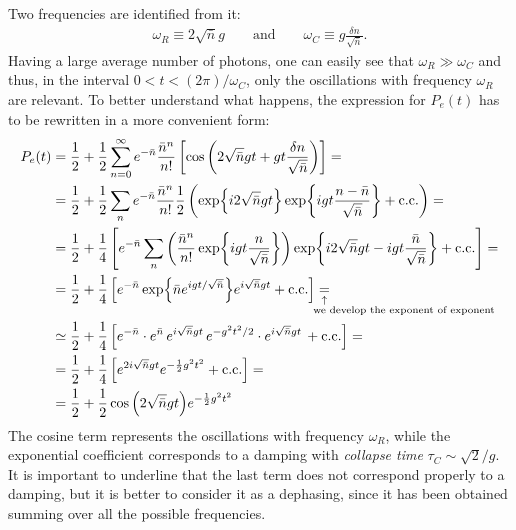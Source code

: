Two frequencies are identified from it: 
\begin{align}
    \omega_R \equiv 2 \sqrt{\bar{n}} g \qquad \text{and} \qquad \omega_C \equiv g \frac{\delta n}{\sqrt{\bar{n}}}. 
\end{align}
Having a large average number of photons, one can easily see that $\omega_R \gg \omega_C$ and thus, in the interval $0 < t < (2 \pi)/\omega_C$, only the oscillations with frequency $\omega_R$ are relevant. To better understand what happens, the expression for $P_e(t)$ has to be rewritten in a more convenient form:
\begin{align}
     P_e(t) & = \frac{1}{2} + \frac{1}{2} \sum_{n=0}^\infty e^{-\bar{n}} \frac{\bar{n}^n}{n!} \left[ \cos{\left( 2  \sqrt{\bar{n}} gt + gt \frac{\delta n}{\sqrt{\bar{n}}} \right)}\right] = \label{eq:st1}\\
     &= \frac{1}{2} + \frac{1}{2} \sum_n e^{-\bar{n}} \frac{\bar{n}^n}{n!} \frac{1}{2} \left( \exp{i 2 \sqrt{\bar{n}} gt} \exp{igt\frac{n-\bar{n}}{\sqrt{\bar{n}}}} + \text{c.c.} \right) = \nonumber \\
     & = \frac{1}{2} + \frac{1}{4}\left[ e^{-\bar{n}} \sum_n \left( \frac{\bar{n}^n}{n!} \exp{igt\frac{n}{\sqrt{\bar{n}}}}\right) \exp{i2\sqrt{\bar{n}}gt - igt\frac{\bar{n}}{\sqrt{\bar{n}}}} + \text{c.c.} \right] =  \nonumber\\
     & = \frac{1}{2} + \frac{1}{4} \left[ e^{-\bar{n}} \exp{\bar{n}e^{igt/\sqrt{\bar{n}}}} e^{i \sqrt{\bar{n}}gt} + \text{c.c.} \right] \equalexpl{we develop the exponent of exponent}  \nonumber\\
     & \simeq \frac{1}{2} + \frac{1}{4} \left[ e^{-\bar{n}} \cdot e^{\bar{n}} \, e^{i\sqrt{\bar{n}}gt} \, e^{-g^2 t^2/2} \cdot e^{i\sqrt{\bar{n}}gt} \,  + \text{c.c.} \right] =  \nonumber\\
    &= \frac{1}{2} + \frac{1}{4} \left[ e^{2i\sqrt{\bar{n}}gt} e^{-\frac{1}{2} g^2 t^2} + \text{c.c.} \right] = \nonumber \\
     & = \frac{1}{2} + \frac{1}{2} \cos{\left(2 \sqrt{\bar{n}}gt\right)} e^{-\frac{1}{2}g^2 t^2} \label{eq:stfin}
\end{align}
The cosine term represents the oscillations with frequency $\omega_R$, while the exponential coefficient corresponds to a damping with \textit{collapse time} $\tau_C \sim \sqrt{2}/g$. It is important to underline that the last term does not correspond properly to a damping, but it is better to consider it as a dephasing, since it has been obtained summing over all the possible frequencies. 

